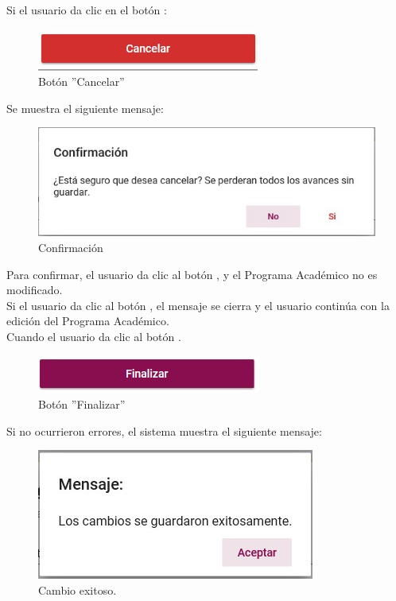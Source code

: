         Si el usuario da clic en el botón :

        \begin{figure}[H]
        	\centering
        	\hypertarget{cancel2}{\includegraphics[width=0.7\linewidth]{images/SP3/BtnCancelar}}
        	\caption{Botón ''Cancelar''}
        	\label{cancel2}
        \end{figure}

       Se muestra el siguiente mensaje:
        \begin{figure}[H]
            \centering
            \hypertarget{confirmar}{\includegraphics[width=0.7\linewidth]{images/SP3/Confirmacion}}
            \caption{Confirmación}
            \label{confirmar}
        \end{figure}

        Para confirmar, el usuario da clic al botón , y el Programa Académico no es modificado.\\

        Si el usuario da clic al botón , el mensaje se cierra y el usuario continúa con la edición del Programa Académico.\\

        Cuando el usuario da clic al botón .
        \begin{figure}[H]
        	\centering
        	\hypertarget{btnfin}{\includegraphics[width=0.7\linewidth]{images/SP3/BtnFinalizar}}
        	\caption{Botón ''Finalizar''}
        	\label{btnfin}
        \end{figure}

        Si no ocurrieron errores, el sistema muestra el siguiente mensaje:

        \begin{figure}[H]
            \centering
            \hypertarget{cambio}{\includegraphics[width=0.7\linewidth]{images/SP3/Cambio}}
            \caption{Cambio exitoso.}
            \label{cambio}
        \end{figure}

